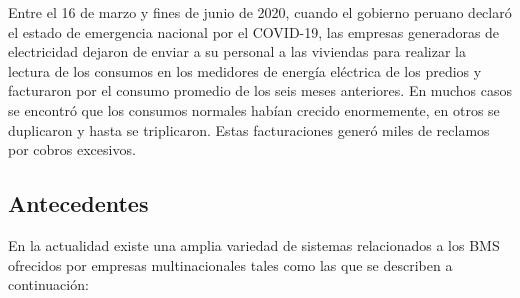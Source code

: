 \documentclass[a4paper, 12pt]{article}
\begin{document}
Entre el 16 de marzo y fines de junio de 2020, cuando el gobierno peruano declaró el estado de emergencia nacional por el COVID-19, las empresas generadoras de electricidad dejaron de enviar a su personal a las viviendas para realizar la lectura de los consumos en los medidores de energía eléctrica de los predios y facturaron por el consumo promedio de los seis meses anteriores. En muchos casos se encontró que los consumos normales habían crecido enormemente, en otros se duplicaron y hasta se triplicaron. Estas facturaciones generó miles de reclamos por cobros excesivos. %


\subsection{Antecedentes}
En la actualidad existe una amplia variedad de sistemas relacionados a los BMS ofrecidos por empresas multinacionales tales como las que se describen a continuación:
\end{document}
